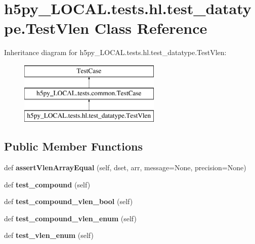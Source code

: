 \hypertarget{classh5py__LOCAL_1_1tests_1_1hl_1_1test__datatype_1_1TestVlen}{}\section{h5py\+\_\+\+L\+O\+C\+A\+L.\+tests.\+hl.\+test\+\_\+datatype.\+Test\+Vlen Class Reference}
\label{classh5py__LOCAL_1_1tests_1_1hl_1_1test__datatype_1_1TestVlen}
Inheritance diagram for h5py\+\_\+\+L\+O\+C\+A\+L.\+tests.\+hl.\+test\+\_\+datatype.\+Test\+Vlen\+:\begin{figure}[H]
\begin{center}
\leavevmode
\includegraphics[height=3.000000cm]{classh5py__LOCAL_1_1tests_1_1hl_1_1test__datatype_1_1TestVlen}
\end{center}
\end{figure}
\subsection*{Public Member Functions}
\begin{DoxyCompactItemize}
\item 
\mbox{\label{classh5py__LOCAL_1_1tests_1_1hl_1_1test__datatype_1_1TestVlen_a7b6b0b8ebf1af8ab47a151872f997d76}} 
def {\bfseries assert\+Vlen\+Array\+Equal} (self, dset, arr, message=None, precision=None)
\item 
\mbox{\label{classh5py__LOCAL_1_1tests_1_1hl_1_1test__datatype_1_1TestVlen_a12e3c4b0f6e66dc36e8afa15b108fd75}} 
def {\bfseries test\+\_\+compound} (self)
\item 
\mbox{\label{classh5py__LOCAL_1_1tests_1_1hl_1_1test__datatype_1_1TestVlen_abfbb04789c354af59d43aee5fdfeb83b}} 
def {\bfseries test\+\_\+compound\+\_\+vlen\+\_\+bool} (self)
\item 
\mbox{\label{classh5py__LOCAL_1_1tests_1_1hl_1_1test__datatype_1_1TestVlen_ac8a6a5891d04f9b68bec301bd3b8ce7a}} 
def {\bfseries test\+\_\+compound\+\_\+vlen\+\_\+enum} (self)
\item 
\mbox{\label{classh5py__LOCAL_1_1tests_1_1hl_1_1test__datatype_1_1TestVlen_a9b3938cb207c2a8bcd8ff206abb16413}} 
def {\bfseries test\+\_\+vlen\+\_\+enum} (self)
\end{DoxyCompactItemize}
